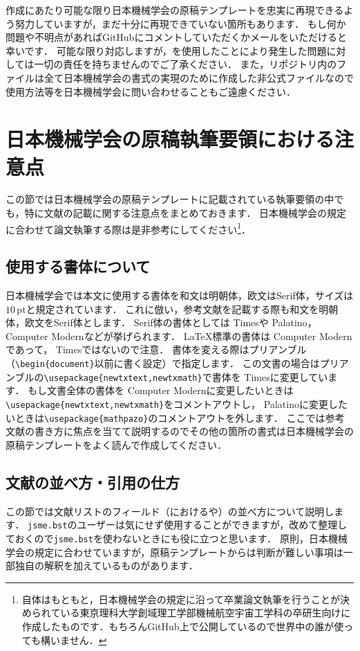 \documentclass[a4paper,fleqn,uplatex,dvipdfmx]{jsarticle}
\newcommand{\jsmefile}{\texttt{jsme.bst}}
\begin{document}
\JSMErepos 作成にあたり可能な限り日本機械学会の原稿テンプレートを忠実に再現できるよう努力していますが，まだ十分に再現できていない箇所もあります．
もし何か問題や不明点があればGitHubにコメントしていただくかメールをいただけると幸いです．
可能な限り対応しますが，\JSMErepos を使用したことにより発生した問題に対しては一切の責任を持ちませんのでご了承ください．
また，\JSMErepos リポジトリ内のファイルは全て日本機械学会の書式の実現のために作成した非公式ファイルなので使用方法等を日本機械学会に問い合わせることもご遠慮ください．


\section{日本機械学会の原稿執筆要領における注意点}
\label{sec:caution}
この節では日本機械学会の原稿テンプレートに記載されている執筆要領の中でも，特に文献の記載に関する注意点をまとめておきます．
日本機械学会の規定に合わせて論文執筆する際は是非参考にしてください\footnote{\JSMErepos 自体はもともと，日本機械学会の規定に沿って卒業論文執筆を行うことが決められている東京理科大学創域理工学部機械航空宇宙工学科の卒研生向けに作成したものです．もちろんGitHub上で公開しているので世界中の誰が使っても構いません．}．

\subsection{使用する書体について}
日本機械学会では本文に使用する書体を和文は明朝体，欧文はSerif体，サイズは$10\,\mathrm{pt}$と規定されています．
これに倣い，参考文献を記載する際も和文を明朝体，欧文をSerif体とします．
Serif体の書体としては{ Times}や{ Palatino}，{ Computer Modern}などが挙げられます．
\LaTeX{}標準の書体は{ Computer Modern}であって，{ Times}ではないので注意．
書体を変える際はプリアンブル（\verb|\begin{document}|以前に書く設定）で指定します．
この文書の場合はプリアンブルの\verb|\usepackage{newtxtext,newtxmath}|で書体を{ Times}に変更しています．
もし文書全体の書体を{ Computer Modern}に変更したいときは\verb|\usepackage{newtxtext,newtxmath}|をコメントアウトし，{ Palatino}に変更したいときは\verb|\usepackage{mathpazo}|のコメントアウトを外します．
ここでは参考文献の書き方に焦点を当てて説明するのでその他の箇所の書式は日本機械学会の原稿テンプレートをよく読んで作成してください．

\subsection{文献の並べ方・引用の仕方}
この節では文献リストのフィールド（\BibTeX{}における\ttauthor や\tttitle）の並べ方について説明します．
\jsmefile のユーザーは気にせず使用することができますが，改めて整理しておくので\jsmefile を使わないときにも役に立つと思います．
原則，日本機械学会の規定に合わせていますが，原稿テンプレートからは判断が難しい事項は一部独自の解釈を加えているものがあります．
\end{document}
